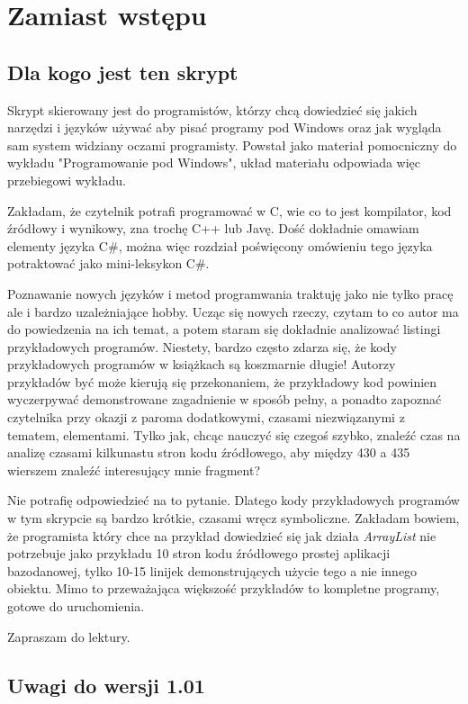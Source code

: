 ﻿\chapter*{Zamiast wstępu}

\section*{Dla kogo jest ten skrypt}

Skrypt skierowany jest do programistów, którzy chcą dowiedzieć się jakich narzędzi i języków używać
aby pisać programy pod Windows oraz jak wygląda sam system widziany oczami programisty. Powstał jako
materiał pomocniczny do wykładu "Programowanie pod Windows", układ materiału odpowiada więc 
przebiegowi wykładu.

Zakładam, że czytelnik potrafi programować w C, wie co to jest kompilator, kod źródłowy i wynikowy, zna
trochę C++ lub Javę. Dość dokładnie omawiam elementy języka C\#, można więc rozdział poświęcony omówieniu
tego języka potraktować jako mini-leksykon C\#.

Poznawanie nowych języków i metod programwania traktuję jako nie tylko pracę ale i bardzo uzależniające
hobby. Ucząc się nowych rzeczy, czytam to co autor ma do powiedzenia na ich temat, a potem
staram się dokładnie analizować listingi przykładowych programów. Niestety, bardzo często zdarza się, że
kody przykładowych programów w książkach są koszmarnie długie! Autorzy przykładów być może kierują się
przekonaniem, że przykładowy kod powinien wyczerpywać demonstrowane zagadnienie w sposób pełny, a
ponadto zapoznać czytelnika przy okazji z paroma dodatkowymi, czasami niezwiązanymi z tematem, elementami. Tylko
jak, chcąc nauczyć się czegoś szybko, znaleźć czas na analizę czasami kilkunastu stron kodu źródłowego,
aby między 430 a 435 wierszem znaleźć interesujący mnie fragment?

Nie potrafię odpowiedzieć na to pytanie. Dlatego kody przykładowych programów w tym skrypcie są bardzo
krótkie, czasami wręcz symboliczne. Zakładam bowiem, że programista który chce na przykład dowiedzieć się
jak działa {\em ArrayList} nie potrzebuje jako przykładu 10 stron kodu źródłowego prostej aplikacji bazodanowej,
tylko 10-15 linijek demonstrujących użycie tego a nie innego obiektu. Mimo to przeważająca większość 
przykładów to kompletne programy, gotowe do uruchomienia.

Zapraszam do lektury.

\section*{Uwagi do wersji 1.01}

